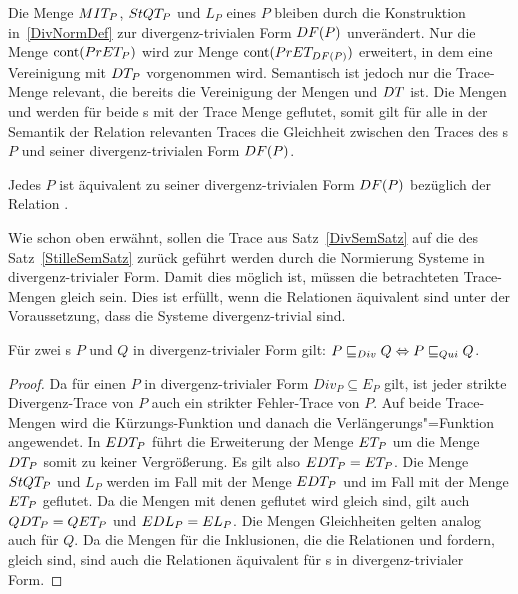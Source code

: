 Die Menge $MIT _P$, $StQT _P$ und $L_P$ eines \MEIO{} $P$ bleiben durch die
Konstruktion in~\ref{DivNormDef} zur divergenz-trivialen Form $DF (P)$
unverändert. Nur die Menge $\mathrm{cont} (PrET _P)$ wird zur Menge $\mathrm{cont} (PrET
_{DF (P)})$ erweitert, in dem eine Vereinigung mit $DT _P$ vorgenommen wird.
Semantisch ist jedoch nur die Trace-Menge \EDT{} relevant, die bereits die
Vereinigung der Mengen \ET{} und $DT{}$ ist. Die Mengen \QDT{} und \EDL{}
werden für beide \MEIO{}s mit der Trace Menge \EDT{} geflutet, somit gilt für
alle in der Semantik der Relation \DRel{} relevanten Traces die Gleichheit
zwischen den Traces des \MEIO{}s $P$ und seiner divergenz-trivialen Form $DF
(P)$.

\begin{Prop}
  \label{DivNormProp}
  Jedes \MEIO{} $P$ ist äquivalent zu seiner divergenz-trivialen Form $DF (P)$
  bezüglich der Relation \DRel{}.
\end{Prop}

Wie schon oben erwähnt, sollen die Trace aus Satz~\ref{DivSemSatz} auf die des
Satz~\ref{StilleSemSatz} zurück geführt werden durch die Normierung Systeme in
divergenz-trivialer Form. Damit dies möglich ist, müssen die betrachteten
Trace-Mengen gleich sein. Dies ist erfüllt, wenn die Relationen äquivalent sind
unter der Voraussetzung, dass die Systeme divergenz-trivial sind.

\begin{Lem}
  Für zwei \MEIO{}s $P$ und $Q$ in divergenz-trivialer Form gilt: $P  \sqsubseteq  _{Div} Q
  \Leftrightarrow P  \sqsubseteq  _{Qui} Q$.
\end{Lem}
\begin{proof}
  Da für einen \MEIO{} $P$ in divergenz-trivialer Form $Div _P \subseteq E _P$
  gilt, ist jeder strikte Divergenz-Trace von $P$ auch ein strikter
  Fehler-Trace von $P$. Auf beide Trace-Mengen wird die Kürzungs-Funktion
  \prune{} und danach die Verlängerungs"=Funktion \cont{} angewendet. In $EDT
  _P$ führt die Erweiterung der Menge $ET _P$ um die Menge $DT _P$ somit zu
  keiner Vergrößerung. Es gilt also $EDT _P = ET _P$. Die Menge $StQT _P$
  und $L _P$ werden im Fall \DRel{} mit der Menge $EDT _P$ und im Fall \QRel{}
  mit der Menge $ET _P$ geflutet. Da die Mengen mit denen geflutet wird gleich
  sind, gilt auch $QDT _P = QET _P$ und $EDL _P = EL _P$. Die Mengen
  Gleichheiten gelten analog auch für $Q$. Da die Mengen für die Inklusionen,
  die die Relationen \DRel{} und \QRel{} fordern, gleich sind, sind auch die
  Relationen äquivalent für \MEIO{}s in divergenz-trivialer Form.
\end{proof}

